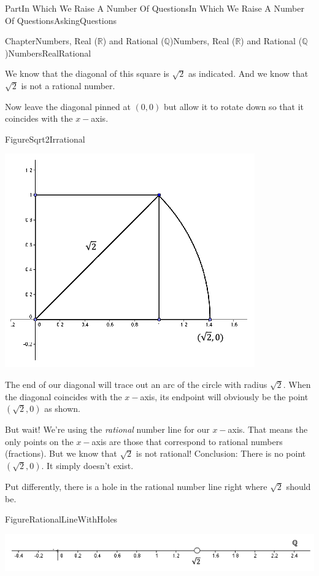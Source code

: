 \documentclass[oneside,10pt,]{book}
\numberwithin{equation}{part}
\newcommand{\RR}{\mathbb {R}}
\newcommand{\QQ}{\mathbb {Q}}
\begin{document}
\begin{partptx}{Part}{In Which We Raise A Number Of Questions}{}{In Which We Raise A Number Of Questions}{}{}{AskingQuestions}
\begin{chapterptx}{Chapter}{Numbers, Real (\(\RR\)) and Rational (\(\QQ\))}{}{Numbers, Real (\(\RR\)) and Rational (\(\QQ\))}{}{}{NumbersRealRational}
\begin{introduction}{}
We know that the diagonal of this square is \(\sqrt{2}\) as indicated. And we know that \(\sqrt{2}\) is not a rational number.%
\par
Now leave the diagonal pinned at \((0,0)\) but allow it to rotate down so that it coincides with the \(x-\)axis.%
\begin{figureptx}{Figure}{}{Sqrt2Irrational}{}%
\begin{image}{0.25}{0.5}{0.25}{}%
\includegraphics[width=\linewidth]{external/images/Sqrt2Irrational.png}
\end{image}%
\tcblower
\end{figureptx}%
The end of our diagonal will trace out an arc of the circle with radius \(\sqrt{2}\). When the diagonal coincides with the \(x-\)axis, its endpoint will obviously be the point \((\sqrt{2}, 0)\) as shown.%
\par
But wait! We're using the \emph{rational} number line for our \(x-\)axis. That means the only points on the \(x-\)axis are those that correspond to rational numbers (fractions). But we know that \(\sqrt{2}\) is not rational! Conclusion: There is no point \((\sqrt{2},0)\). It simply doesn't exist.%
\par
Put differently, there is a hole in the rational number line right where \(\sqrt{2}\) should be.%
\begin{figureptx}{Figure}{}{RationalLineWithHoles}{}%
\begin{image}{0}{1}{0}{}%
\includegraphics[width=\linewidth]{external/images/RationalLineWithHoles.png}

\end{image}
\end{figureptx}
\end{introduction}
\end{chapterptx}
\end{partptx}
\end{document}
